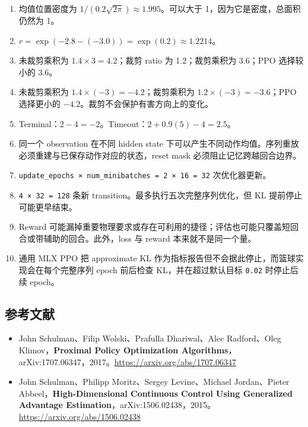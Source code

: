 \documentclass[
  chinese,
  11pt,
  letterpaper,
]{article}
\providecommand{\tightlist}{%
  \setlength{\itemsep}{0pt}\setlength{\parskip}{0pt}}
\begin{document}
\begin{enumerate}
\def\labelenumi{\arabic{enumi}.}
\tightlist
\item
  均值位置密度为 \(1/(0.2\sqrt{2\pi})\approx1.995\)。可以大于
  1，因为它是密度，总面积仍然为 1。
\item
  \(r=\exp(-2.8-(-3.0))=\exp(0.2)\approx1.2214\)。
\item
  未裁剪乘积为 \(1.4\times3=4.2\)；裁剪 ratio 为 1.2；裁剪乘积为
  3.6；PPO 选择较小的 3.6。
\item
  未裁剪乘积为 \(1.4\times(-3)=-4.2\)；裁剪乘积为
  \(1.2\times(-3)=-3.6\)；PPO 选择更小的
  \(-4.2\)。裁剪不会保护有害方向上的变化。
\item
  Terminal：\(2-4=-2\)。Timeout：\(2+0.9(5)-4=2.5\)。
\item
  同一个 observation 在不同 hidden state
  下可以产生不同动作均值。序列重放必须重建与已保存动作对应的状态，reset
  mask 必须阻止记忆跨越回合边界。
\item
  \texttt{update\_epochs\ ×\ num\_minibatches\ =\ 2\ ×\ 16\ =\ 32}
  次优化器更新。
\item
  \texttt{4\ ×\ 32\ =\ 128} 条新
  transition。最多执行五次完整序列优化，但 KL 提前停止可能更早结束。
\item
  Reward
  可能漏掉重要物理要求或存在可利用的捷径；评估也可能只覆盖短回合或带辅助的回合。此外，loss
  与 reward 本来就不是同一个量。
\item
  通用 MLX PPO 把 approximate KL
  作为指标报告但不会据此停止，而篮球实现会在每个完整序列 epoch 前后检查
  KL，并在超过默认目标 \texttt{0.02} 时停止后续 epoch。
\end{enumerate}

\subsection{参考文献}\label{ux53c2ux8003ux6587ux732e}

\begin{itemize}
\tightlist
\item
  John Schulman、Filip Wolski、Prafulla Dhariwal、Alec Radford、Oleg
  Klimov，\textbf{Proximal Policy Optimization
  Algorithms}，arXiv:1707.06347，2017。\url{https://arxiv.org/abs/1707.06347}
\item
  John Schulman、Philipp Moritz、Sergey Levine、Michael Jordan、Pieter
  Abbeel，\textbf{High-Dimensional Continuous Control Using Generalized
  Advantage
  Estimation}，arXiv:1506.02438，2015。\url{https://arxiv.org/abs/1506.02438}
\end{itemize}
\end{document}

